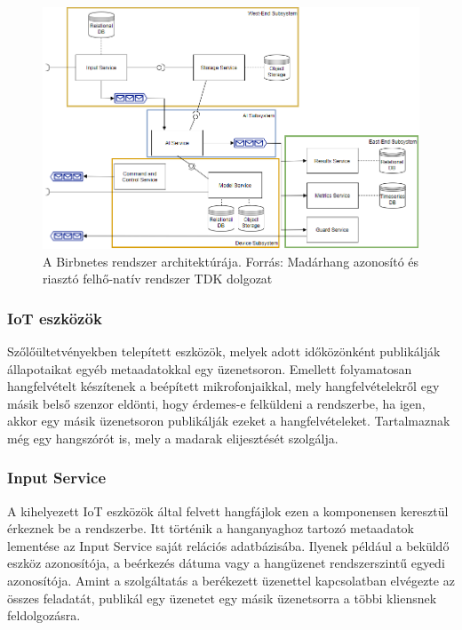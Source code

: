 \begin{figure}[!ht]
\centering
\includegraphics[width=150mm, keepaspectratio]{figures/architecture-redesigned.png}
\caption{A Birbnetes rendszer architektúrája. Forrás: Madárhang azonosító és riasztó felhő-natív rendszer TDK dolgozat \cite{birdnetes-tdk}}
\label{fig:birdnetes-components}
\end{figure}

\subsubsection{IoT eszközök}
Szőlőültetvényekben telepített eszközök, melyek adott időközönként publikálják állapotaikat egyéb metaadatokkal egy üzenetsoron.
Emellett folyamatosan hangfelvételt készítenek a beépített mikrofonjaikkal, mely hangfelvételekről egy másik belső szenzor eldönti,
hogy érdemes-e felküldeni a rendszerbe, ha igen, akkor egy másik üzenetsoron publikálják ezeket a hangfelvételeket.
Tartalmaznak még egy hangszórót is, mely a madarak elijesztését szolgálja.

\subsubsection{Input Service}
\label{subsect:birdnetes-input-service}
A kihelyezett IoT eszközök által felvett hangfájlok ezen a komponensen keresztül érkeznek be a rendszerbe.
Itt történik a hanganyaghoz tartozó metaadatok lementése az Input Service saját relációs adatbázisába. 
Ilyenek például a beküldő eszköz azonosítója, a beérkezés dátuma vagy a hangüzenet rendszerszintű egyedi azonosítója.
Amint a szolgáltatás a berékezett üzenettel kapcsolatban elvégezte az összes feladatát, 
publikál egy üzenetet egy másik üzenetsorra a többi kliensnek feldolgozásra.

